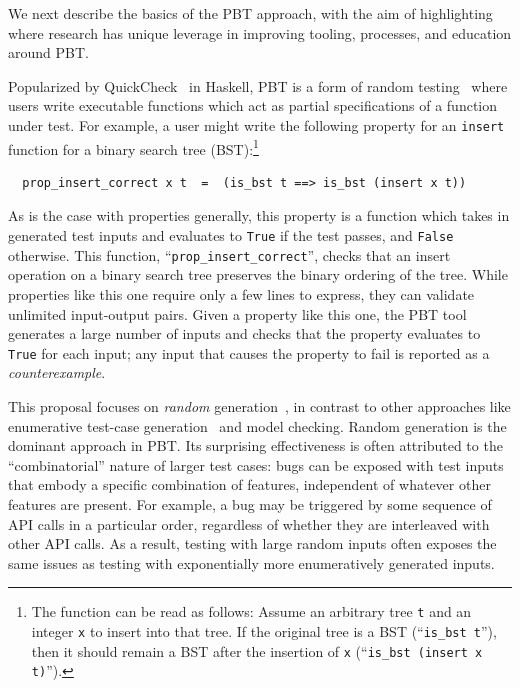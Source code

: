 
We next describe the basics of the PBT approach, with the aim of highlighting 
where research has unique leverage in improving tooling, processes, and 
education around PBT.

Popularized by QuickCheck~\cite{hughes2007quickcheck} in Haskell,
PBT is a form of random testing~\cite{hamlet1994random} where
users write executable functions which act as partial
specifications of a function under test. For example, a user might
write the following property for an \lstinline{insert}
function for a binary search tree (BST):\footnote{The function can be read as
follows:
Assume an arbitrary tree \texttt{t} and an integer
\texttt{x} to insert into that tree. If the original tree
is a BST (``\lstinline{is_bst t}''), then it should remain
a BST after the insertion of \texttt{x} (``\lstinline{is_bst (insert x t)}'').}
\begin{lstlisting}
  prop_insert_correct x t  =  (is_bst t ==> is_bst (insert x t))
\end{lstlisting}
As is the case with properties generally, this property is a function which 
takes in generated
test inputs and evaluates to \lstinline{True} if the test passes, and
\lstinline{False} otherwise.  This function, ``\verb|prop_insert_correct|'',
checks
that an insert operation on a binary search tree preserves the
binary ordering of the tree.
While properties like this one require
only a few lines to express, they can validate unlimited
input-output pairs.  Given a property like this one, the PBT tool generates a
large number of inputs and
checks that the property evaluates to \lstinline{True} for each input; any input
that causes the property to fail is reported as a {\em counterexample}.

This proposal focuses on {\em random}
generation~\cite{hamlet1994random}, in contrast to other
approaches like enumerative test-case
generation~\cite{DBLP:conf/haskell/RuncimanNL08, leancheck} and model
checking. Random generation is the dominant approach in PBT. Its
surprising effectiveness is often attributed to the
``combinatorial'' nature of larger test cases: bugs can be
exposed with test inputs that embody a specific combination of features,
independent of whatever other features are present. For example,
a bug may be triggered by some sequence of API calls in a
particular order,
regardless of whether they are
interleaved with other API calls. As a result, testing with large random
inputs often exposes the same issues as testing with exponentially more
enumeratively generated inputs.

